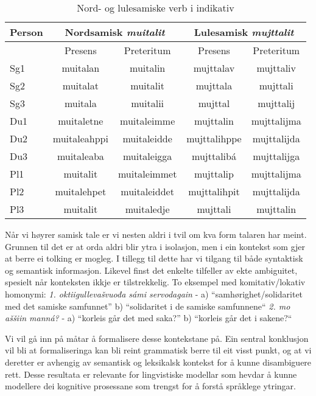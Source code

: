 \documentclass[a4paper,norsk]{article}
\begin{document}
\begin{table}[htdp]
\caption{Nord- og lulesamiske verb i indikativ}
\begin{center}
\begin{tabular}{|l|c|c||c|c|}
\hline
Person & \multicolumn{2}{|c||}{Nordsamisk \textit{muitalit}} & \multicolumn{2}{|c|}{Lulesamisk \textit{mujttalit}} \\
\hline
 & Presens & Preteritum & Presens & Preteritum \\
\hline \hline 
Sg1 & muitalan & muitalin &  mujttalav & mujttaliv \\
\hline
Sg2 & muitalat & muitalit & mujttala & mujttali \\
\hline
Sg3 & muitala & muitalii & mujttal & mujttalij \\
\hline
\hline
Du1  & muitaletne & muitaleimme & mujttalin & mujttalijma \\
\hline
Du2 & muitaleahppi & muitaleidde & mujttalihppe & mujttalijda \\
\hline
Du3 & muitaleaba & muitaleigga & mujttalibá & mujttalijga \\
\hline
\hline
Pl1  & muitalit & muitaleimmet & mujttalip & mujttalijma \\
\hline
Pl2 & muitalehpet & muitaleiddet & mujttalihpit & mujttalijda  \\
\hline
Pl3 & muitalit & muitaledje & mujttali & mujttalin \\
\hline
\hline
\end{tabular}
\end{center}
\label{verb}
\end{table}%

Når vi høyrer samisk tale er vi nesten aldri i tvil om kva form talaren har meint. Grunnen til det er at orda aldri blir ytra i isolasjon, men i ein kontekst som gjer at berre ei tolking er mogleg. I tillegg til dette har vi tilgang til både syntaktisk og semantisk informasjon. Likevel finst det enkelte tilfeller av ekte ambiguitet, spesielt når konteksten ikkje er tilstrekkelig. To eksempel med komitativ/lokativ homonymi: \textit{1. oktiigullevašvuođa sámi servodagain}  - a) ``samhørighet/solidaritet med det samiske samfunnet'' b) ``solidaritet i de samiske samfunnene`` \textit{2. mo aššiin manná?} - a) ``korleis går det med saka?'' b) ``korleis går det i sakene?`` 

Vi vil gå inn på måtar å formalisere desse kontekstane på. Ein sentral konklusjon vil bli at formaliseringa kan bli reint grammatisk berre til eit visst punkt, og at vi deretter er avhengig av semantisk og leksikalsk kontekst for å kunne disambiguere rett. Desse resultata er relevante for lingvistiske modellar som hevdar å kunne modellere dei kognitive prosessane som trengst for å forstå språklege ytringar.%
\end{document}
